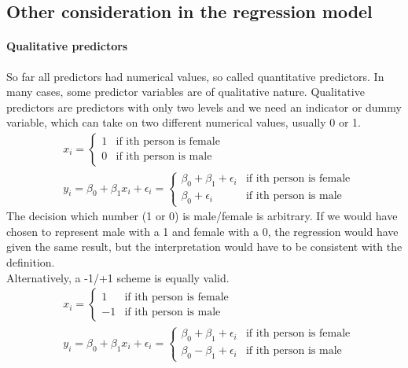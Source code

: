 \documentclass[../document.tex]{subfiles}
\begin{document}
	\subsection{Other consideration in the regression model}

	\paragraph{Qualitative predictors}
	So far all predictors had numerical values, so called quantitative predictors. In many cases, some predictor variables are of qualitative nature. Qualitative predictors are predictors with only two levels and we need an indicator or dummy variable, which can take on two different numerical values, usually 0 or 1.
	\begin{equation}
	\begin{split}
		&x_{i}=\begin{cases}
			1 &\text{if ith person is female}\\
			0 &\text{if ith person is male}
		\end{cases}\\
		&y_{i} = \beta_{0}+\beta_{1}x_{i}+\epsilon_{i}=\begin{cases}
			\beta_{0}+\beta_{1}+\epsilon_{i} &\text{if ith person is female}\\
			\beta_{0}+\epsilon_{i} &\text{if ith person is male}
		\end{cases}
	\end{split}
	\end{equation}
	The decision which number (1 or 0) is male/female is arbitrary. If we would have chosen to represent male with a 1 and female with a 0, the regression would have given the same result, but the interpretation would have to be consistent with the definition.\\
	Alternatively, a -1/+1 scheme is equally valid.
	\begin{equation}
	\begin{split}
	&x_{i}=\begin{cases}
	1 &\text{if ith person is female}\\
	-1 &\text{if ith person is male}
	\end{cases}\\
	&y_{i} = \beta_{0}+\beta_{1}x_{i}+\epsilon_{i}=\begin{cases}
	\beta_{0}+\beta_{1}+\epsilon_{i} &\text{if ith person is female}\\
	\beta_{0}-\beta_{1}+\epsilon_{i} &\text{if ith person is male}
	\end{cases}
	\end{split}
	\end{equation}
\end{document}
